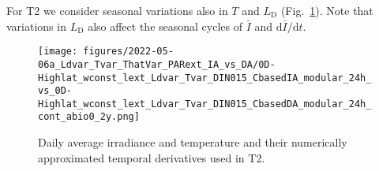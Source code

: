 \documentclass[gmd, manuscript]{copernicus}
\newcommand{\onur}[1]{\textcolor{blue}{\{Onur: #1\}}}
\begin{document}
For T2 we consider seasonal variations also in $T$ and $L_{\text{D}}$ (Fig.~\ref{f.T2env}).  Note that variations in $L_{\text{D}}$ also affect the seasonal cycles of $\bar{I}$ and $\text{d}\bar{I}/\text{d}t$.

\begin{figure}[ht!]
  \texttt{[image: figures/2022-05-06a\_Ldvar\_Tvar\_ThatVar\_PARext\_IA\_vs\_DA/0D-Highlat\_wconst\_lext\_Ldvar\_Tvar\_DIN015\_CbasedIA\_modular\_24h\_vs\_0D-Highlat\_wconst\_lext\_Ldvar\_Tvar\_DIN015\_CbasedDA\_modular\_24h\_cont\_abio0\_2y.png]}
  \caption{Daily average irradiance and temperature and their numerically approximated temporal derivatives used in T2.\label{f.T2env}}
\end{figure}


%
\end{document}
